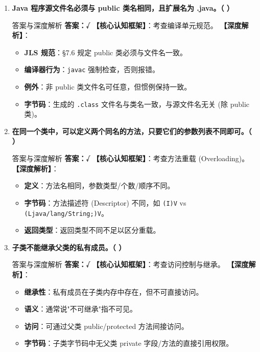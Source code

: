 \documentclass[12pt, a4paper]{ctexart}
\newcommand{\code}[1]{\texttt{\color{myblue}#1}}
\begin{document}
\begin{enumerate}[label=\arabic*.]
	\item \textbf{Java 程序源文件名必须与 public 类名相同，且扩展名为 .java。（ \quad ）}
	      \begin{bluebox}{答案与深度解析}
		      \textbf{答案：√}
		      \textbf{【核心认知框架】}：考查编译单元规范。
		      \textbf{【深度解析】}：
		      \begin{itemize}[leftmargin=*, nosep]
			      \item \textbf{JLS 规范}：§7.6 规定 public 类必须与文件名一致。
			      \item \textbf{编译器行为}：\code{javac} 强制检查，否则报错。
			      \item \textbf{例外}：非 public 类文件名可任意，但惯例保持一致。
			      \item \textbf{字节码}：生成的 \code{.class} 文件名与类名一致，与源文件名无关 (除 public 类)。
		      \end{itemize}
	      \end{bluebox}

	\item \textbf{在同一个类中，可以定义两个同名的方法，只要它们的参数列表不同即可。（ \quad ）}
	      \begin{bluebox}{答案与深度解析}
		      \textbf{答案：√}
		      \textbf{【核心认知框架】}：考查方法重载 (Overloading)。
		      \textbf{【深度解析】}：
		      \begin{itemize}[leftmargin=*, nosep]
			      \item \textbf{定义}：方法名相同，参数类型/个数/顺序不同。
			      \item \textbf{字节码}：方法描述符 (Descriptor) 不同，如 \code{(I)V} vs \code{(Ljava/lang/String;)V}。
			      \item \textbf{返回类型}：返回类型不同不足以区分重载。
		      \end{itemize}
	      \end{bluebox}

	\item \textbf{子类不能继承父类的私有成员。（ \quad ）}
	      \begin{bluebox}{答案与深度解析}
		      \textbf{答案：√}
		      \textbf{【核心认知框架】}：考查访问控制与继承。
		      \textbf{【深度解析】}：
		      \begin{itemize}[leftmargin=*, nosep]
			      \item \textbf{继承性}：私有成员在子类内存中存在，但不可直接访问。
			      \item \textbf{语义}：通常说"不可继承"指不可见。
			      \item \textbf{访问}：可通过父类 public/protected 方法间接访问。
			      \item \textbf{字节码}：子类字节码中无父类 private 字段/方法的直接引用权限。
		      \end{itemize}
	      \end{bluebox}


\end{enumerate}
\end{document}
